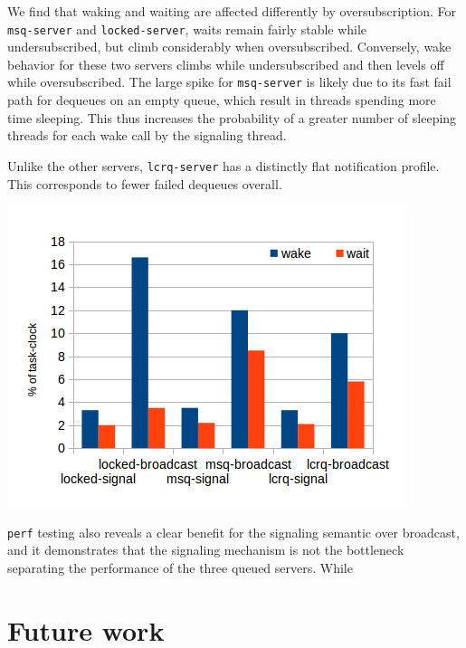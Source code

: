 \documentclass[twoside,10pt]{article}
\newenvironment{Figure}
  {\par\medskip\noindent\minipage{\linewidth}}
  {\endminipage\par\medskip}
\begin{document}
\begin{multicols}{2}
We find that waking and waiting are affected differently by
oversubscription. For \verb+msq-server+ and \verb+locked-server+,
waits remain fairly stable while undersubscribed, but climb considerably
when oversubscribed. Conversely, wake behavior for these two servers
climbs while undersubscribed and then levels off while
oversubscribed. The large spike for \verb+msq-server+ is likely due to
its fast fail path for dequeues on an empty queue, which result in
threads spending more time sleeping. This thus increases the
probability of a greater number of sleeping threads for each wake call
by the signaling thread.

Unlike the other servers, \verb+lcrq-server+ has a distinctly flat
notification profile. This corresponds to fewer failed dequeues
overall.

\begin{Figure}
\includegraphics[width=\linewidth]{img/signal-broadcast-8.png}
\label{fig:perf-latency-nthreads}
\end{Figure}

\verb+perf+ testing also reveals a clear benefit for the signaling
semantic over broadcast, and it demonstrates that the signaling
mechanism is not the bottleneck separating the performance of the
three queued servers. While 

\section{Future work}


\end{multicols}
\end{document}
